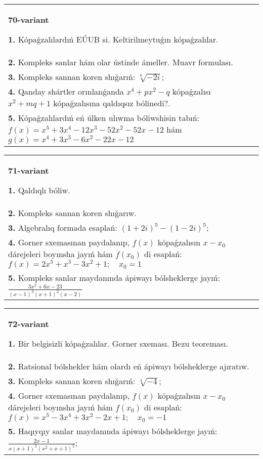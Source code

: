 \documentclass{article}
\begin{document}
\begin{tabular}{m{17cm}}
\textbf{70-variant}
\newline

\textbf{1.} Kópaǵzalılardıń EÚUB si. Keltirilmeytuǵın   kópaǵzalılar. \\
\textbf{2.} Kompleks sanlar hám olar ústinde ámeller. Muavr formulası.  \\
\textbf{3.} Kompleks sannan koren shıǵarıń: $\sqrt[6]{-2 i}$; \\
\textbf{4.} Qanday shártler orınlanǵanda $x^4+p x^2-q$ kópaǵzalısı $x^2+m q+1$ kópaǵzalısına qaldıqsız bólinedi?. \\
\textbf{5.} Kópaǵzalılardıń eń úlken ulıwma bóliwshisin tabıń:  $f(x)=x^5+3 x^4-12 x^3-52 x^2-52 x-12$ hám $g(x)=x^4+3 x^3-6 x^2-22 x-12$ \\

\end{tabular}
\vspace{1cm}


\begin{tabular}{m{17cm}}
\textbf{71-variant}
\newline

\textbf{1.} Qaldıqlı bóliw.  \\
\textbf{2.} Kompleks sannan koren shıǵarıw. \\
\textbf{3.} Algebralıq formada esaplań: $(1+2 i)^5-(1-2 i)^5$; \\
\textbf{4.} Gorner sxemasınan paydalanıp, $f(x)$ kópaǵzalısın $x-x_0$ dárejeleri boyınsha jayıń hám $f\left(x_0\right)$ di esaplań:  $f(x)=2 x^5+x^3-3 x^2+1 ; \quad x_0=1$ \\
\textbf{5.} Kompleks sanlar maydanında ápiwayı bólsheklerge jayıń: $\frac{3 x^2+6 x-23}{(x-1)^3(x+1)^2(x-2)}$ \\

\end{tabular}
\vspace{1cm}


\begin{tabular}{m{17cm}}
\textbf{72-variant}
\newline

\textbf{1.} Bir belgisizli kópaǵzalılar. Gorner sxeması. Bezu teoreması.  \\
\textbf{2.} Ratsional bólshekler hám olardı eń ápiwayı bólsheklerge ajıratıw. \\
\textbf{3.} Kompleks sannan koren shıǵarıń: $\sqrt[4]{-4}$; \\
\textbf{4.} Gorner sxemasınan paydalanıp, $f(x)$ kópaǵzalısın $x-x_0$ dárejeleri boyınsha jayıń hám $f\left(x_0\right)$ di esaplań: $f(x)=x^5-3 x^4+3 x^2-2 x+1 ; \quad x_0=-1$ \\
\textbf{5.} Haqıyqıy sanlar maydanında ápiwayı bólsheklerge jayıń:  $\frac{2 x-1}{x(x+1)^2\left(x^2+x+1\right)^2}$; \\

\end{tabular}
\vspace{1cm}
\end{document}
